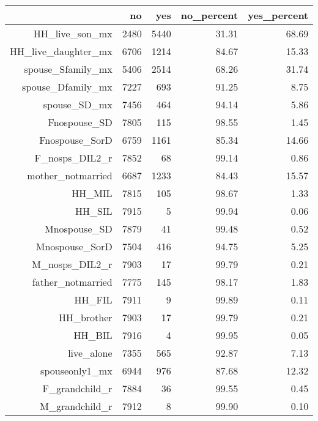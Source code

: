 \documentclass[11pt]{article}
\begin{document}
\begin{table}[ht]
\centering
\begin{tabular}{rrrrr}
  \hline
 & no & yes & no\_percent & yes\_percent \\ 
  \hline
HH\_live\_son\_mx & 2480 & 5440 & 31.31 & 68.69 \\ 
  HH\_live\_daughter\_mx & 6706 & 1214 & 84.67 & 15.33 \\ 
  spouse\_Sfamily\_mx & 5406 & 2514 & 68.26 & 31.74 \\ 
  spouse\_Dfamily\_mx & 7227 & 693 & 91.25 & 8.75 \\ 
  spouse\_SD\_mx & 7456 & 464 & 94.14 & 5.86 \\ 
  Fnospouse\_SD & 7805 & 115 & 98.55 & 1.45 \\ 
  Fnospouse\_SorD & 6759 & 1161 & 85.34 & 14.66 \\ 
  F\_nosps\_DIL2\_r & 7852 & 68 & 99.14 & 0.86 \\ 
  mother\_notmarried & 6687 & 1233 & 84.43 & 15.57 \\ 
  HH\_MIL & 7815 & 105 & 98.67 & 1.33 \\ 
  HH\_SIL & 7915 & 5 & 99.94 & 0.06 \\ 
  Mnospouse\_SD & 7879 & 41 & 99.48 & 0.52 \\ 
  Mnospouse\_SorD & 7504 & 416 & 94.75 & 5.25 \\ 
  M\_nosps\_DIL2\_r & 7903 & 17 & 99.79 & 0.21 \\ 
  father\_notmarried & 7775 & 145 & 98.17 & 1.83 \\ 
  HH\_FIL & 7911 & 9 & 99.89 & 0.11 \\ 
  HH\_brother & 7903 & 17 & 99.79 & 0.21 \\ 
  HH\_BIL & 7916 & 4 & 99.95 & 0.05 \\ 
  live\_alone & 7355 & 565 & 92.87 & 7.13 \\ 
  spouseonly1\_mx & 6944 & 976 & 87.68 & 12.32 \\ 
  F\_grandchild\_r & 7884 & 36 & 99.55 & 0.45 \\ 
  M\_grandchild\_r & 7912 & 8 & 99.90 & 0.10 \\ 
   \hline
\end{tabular}
\end{table}
\end{document}
